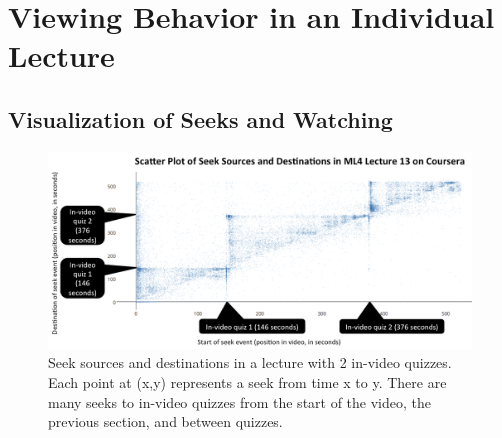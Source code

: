 \documentclass{sigchi}
\begin{document}



\section{Viewing Behavior in an Individual Lecture}


\subsection{Visualization of Seeks and Watching}

\begin{figure}
\includegraphics[width=2.0\columnwidth]{scatter-plot-of-seeks}
\caption{Seek sources and destinations in a lecture with 2 in-video quizzes. Each point at (x,y) represents a seek from time x to y. There are many seeks to in-video quizzes from the start of the video, the previous section, and between quizzes.}
\label{fig:scatter-plot-of-seeks}
\end{figure}
\end{document}
